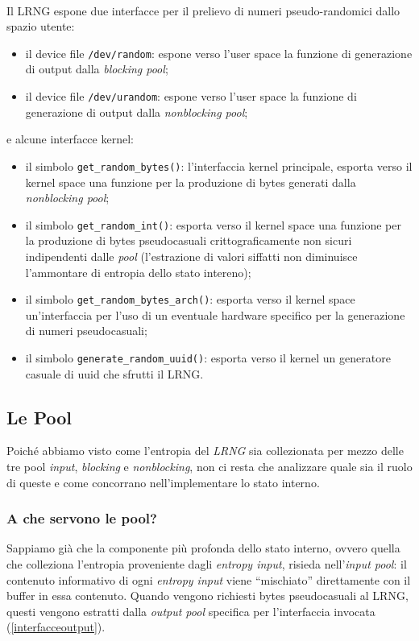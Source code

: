 \documentclass{article}
\begin{document}
 \paragraph{}Il LRNG espone due interfacce per il prelievo di
 numeri pseudo-randomici dallo spazio utente:
 \begin{itemize}
   \item il device file \verb+/dev/random+: espone verso l'user space la
   funzione di generazione di output dalla \emph{blocking pool};
   \item il device file \verb+/dev/urandom+: espone verso l'user space la
   funzione di generazione di output dalla \emph{nonblocking pool};
   
 \end{itemize}
 e alcune interfacce kernel:
 \begin{itemize}
	\item il simbolo \verb+get_random_bytes()+: l'interfaccia kernel
	principale, esporta verso il kernel space una funzione per la produzione di
	bytes generati dalla \emph{nonblocking pool};
   \item il simbolo \verb+get_random_int()+: esporta
   verso il kernel space una funzione per la produzione di bytes pseudocasuali
   crittograficamente non sicuri indipendenti dalle \emph{pool} (l'estrazione
   di valori siffatti non diminuisce l'ammontare di entropia dello stato
   intereno);
   \item il simbolo \verb+get_random_bytes_arch()+: esporta verso il kernel
   space un'interfaccia per l'uso di un eventuale hardware specifico per la 
   generazione di numeri pseudocasuali;
   \item il simbolo \verb+generate_random_uuid()+: esporta verso il kernel un
   generatore casuale di uuid che sfrutti il LRNG.
 \end{itemize}

 

\subsection{Le Pool}\label{pool}
 Poiché abbiamo visto come l'entropia del \emph{LRNG} sia collezionata per mezzo
 delle tre pool \emph{input}, \emph{blocking} e \emph{nonblocking}, non ci resta
 che analizzare quale sia il ruolo di queste e come concorrano
 nell'implementare lo stato interno.
 \subsubsection{A che servono le pool?}\label{poolACosaServono}
 Sappiamo già che la componente più profonda dello stato interno, ovvero quella
 che colleziona l'entropia proveniente dagli \emph{entropy input}, risieda
 nell'\emph{input pool}: il contenuto informativo di ogni \emph{entropy input}
 viene ``mischiato'' direttamente con il buffer in essa contenuto.
 Quando vengono richiesti bytes pseudocasuali al LRNG, questi vengono
 estratti dalla \emph{output pool} specifica per l'interfaccia invocata
 (\ref{interfacceoutput}).
\end{document}
